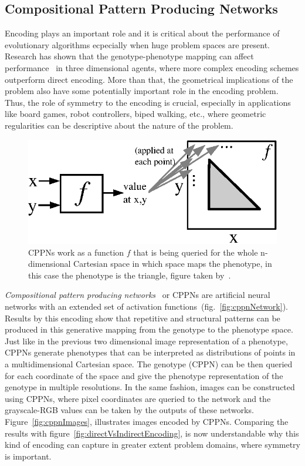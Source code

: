\subsection{Compositional Pattern Producing Networks}

Encoding plays an important role and it is critical about the performance of evolutionary algorithms ecpecially when huge problem spaces are present. Research has shown that the genotype-phenotype mapping can affect performance~\citep{komosinski2001comparison} in three dimensional agents, where more complex encoding schemes outperform direct encoding. More than that, the geometrical implications of the problem also have some potentially important role in the encoding problem. Thus, the role of symmetry to the encoding is crucial, especially in applications like board games, robot controllers, biped walking, etc., where geometric regularities can be descriptive about the nature of the problem.

\begin{figure}[b!]
\centering
\includegraphics{../Figures/Misc/cppnResolution.eps}
\caption{CPPNs work as a function $f$ that is being queried for the whole n-dimensional Cartesian space in which space maps the phenotype, in this case the phenotype is the triangle, figure taken by~\citep{stanley2007compositional}.}
\label{fig:cppnResolution}
\end{figure}

\emph{Compositional pattern producing networks}~\citep{stanley2007compositional} or CPPNs are artificial neural networks with an extended set of activation functions~(fig.~\ref{fig:cppnNetwork}). Results by this encoding show that repetitive and structural patterns can be produced in this generative mapping from the genotype to the phenotype space. Just like in the previous two dimensional image representation of a phenotype, CPPNs generate phenotypes that can be interpreted as distributions of points in a multidimensional Cartesian space. The genotype (CPPN) can be then queried for each coordinate of the space and give the phenotype representation of the genotype in multiple resolutions. In the same fashion, images can be constructed using CPPNs, where pixel coordinates are queried to the network and the grayscale-RGB values can be taken by the outputs of these networks. Figure~\ref{fig:cppnImages}, illustrates images encoded by CPPNs. Comparing the results with figure~\ref{fig:directVsIndirectEncoding}, is now understandable why this kind of encoding can capture in greater extent problem domains, where symmetry is important.

